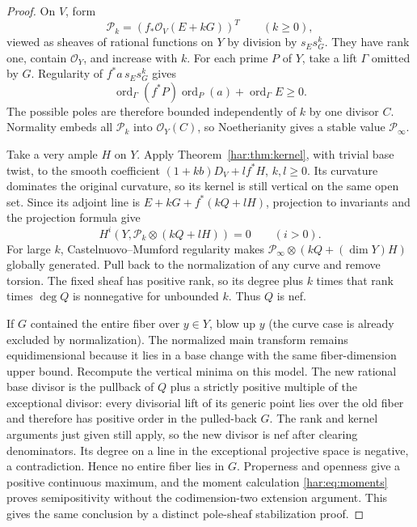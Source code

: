 \begin{proof}
On \(V\), form
\[
 \mathcal P_k=(f_*\mathcal O_V(E+kG))^T\qquad(k\ge0),
\]
viewed as sheaves of rational functions on \(Y\) by division by
\(s_Es_G^k\). They have rank one, contain \(\mathcal O_Y\), and increase
with \(k\). For each prime \(P\) of \(Y\), take a lift \(\Gamma\)
omitted by \(G\). Regularity of \(f^*a\,s_Es_G^k\) gives
\[
 \operatorname{ord}_{\Gamma}(f^*P)\operatorname{ord}_P(a)
      +\operatorname{ord}_{\Gamma}E\ge0.
\]
The possible poles are therefore bounded independently of \(k\) by
one divisor \(C\). Normality embeds all \(\mathcal P_k\) into
\(\mathcal O_Y(C)\), so Noetherianity gives a stable value
\(\mathcal P_\infty\).

Take a very ample \(H\) on \(Y\). Apply
Theorem~\ref{har:thm:kernel}, with trivial base twist, to the smooth coefficient
\((1+kb)D_V+lf^*H\), \(k,l\ge0\). Its curvature dominates the original
curvature, so its kernel is still vertical on the same open set.
Since its adjoint line is \(E+kG+f^*(kQ+lH)\), projection to
invariants and the projection formula give
\[
 H^i(Y,\mathcal P_k\otimes(kQ+lH))=0\qquad(i>0).
\]
For large \(k\), Castelnuovo--Mumford regularity makes
\(\mathcal P_\infty\otimes(kQ+(\dim Y)H)\) globally generated. Pull
back to the normalization of any curve and remove torsion. The fixed
sheaf has positive rank, so its degree plus \(k\) times that rank times
\(\deg Q\) is nonnegative for unbounded \(k\). Thus \(Q\) is nef.

If \(G\) contained the entire fiber over \(y\in Y\), blow up \(y\)
(the curve case is already excluded by normalization). The normalized
main transform remains equidimensional because it lies in a base
change with the same fiber-dimension upper bound. Recompute the
vertical minima on this model. The new rational base divisor is the
pullback of \(Q\) plus a strictly positive multiple of the exceptional
divisor: every divisorial lift of its generic point lies over the
old fiber and therefore has positive order in the pulled-back \(G\).
The rank and kernel arguments just given still apply, so the new
divisor is nef after clearing denominators. Its degree on a line in
the exceptional projective space is negative, a contradiction. Hence
no entire fiber lies in \(G\). Properness and openness give a positive
continuous maximum, and the moment calculation
\eqref{har:eq:moments} proves semipositivity without the codimension-two
extension argument. This gives the same conclusion by a distinct
pole-sheaf stabilization proof.
\end{proof}
